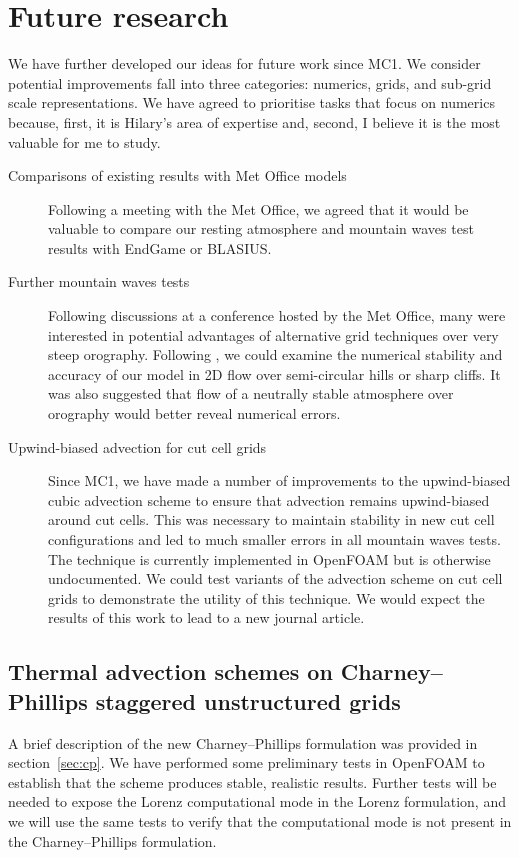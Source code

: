 \documentclass[a4paper]{article}
\begin{document}
\section{Future research}

We have further developed our ideas for future work since MC1.  We consider potential improvements fall into three categories: numerics, grids, and sub-grid scale representations.  We have agreed to prioritise tasks that focus on numerics because, first, it is Hilary's area of expertise and, second, I believe it is the most valuable for me to study.

\begin{description}
	\item[Comparisons of existing results with Met Office models]{Following a meeting with the Met Office, we agreed that it would be valuable to compare our resting atmosphere and mountain waves test results with EndGame or BLASIUS.}
	\item[Further mountain waves tests]{Following discussions at a conference hosted by the Met Office, many were interested in potential advantages of alternative grid techniques over very steep orography.  Following \citet{yamazaki-satomura2010}, we could examine the numerical stability and accuracy of our model in 2D flow over semi-circular hills or sharp cliffs.  It was also suggested that flow of a neutrally stable atmosphere over orography would better reveal numerical errors.}
	\item[Upwind-biased advection for cut cell grids]{Since MC1, we have made a number of improvements to the upwind-biased cubic advection scheme to ensure that advection remains upwind-biased around cut cells.  This was necessary to maintain stability in new cut cell configurations and led to much smaller errors in all mountain waves tests.  The technique is currently implemented in OpenFOAM but is otherwise undocumented.  We could test variants of the advection scheme on cut cell grids to demonstrate the utility of this technique.  We would expect the results of this work to lead to a new journal article.}
\end{description}

\subsection*{Thermal advection schemes on Charney--Phillips staggered unstructured grids}
A brief description of the new Charney--Phillips formulation was provided in section~\ref{sec:cp}.  We have performed some preliminary tests in OpenFOAM to establish that the scheme produces stable, realistic results.  Further tests will be needed to expose the Lorenz computational mode in the Lorenz formulation, and we will use the same tests to verify that the computational mode is not present in the Charney--Phillips formulation.
		
\end{document}
